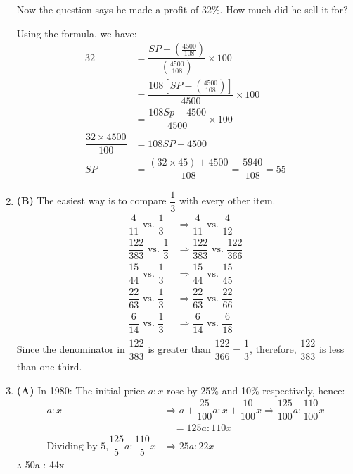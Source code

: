 \begin{multicols}{2}
\begin{enumerate}[label={\arabic*.}]
    Now the question says he made a profit of 32\%. How much did he sell it for?
    
    Using the formula, we have:
    \begin{align*}
    32 &= \dfrac{SP - \left(\frac{4500}{108}\right)}{\left(\frac{4500}{108}\right)} \times 100 \\
    &= \dfrac{108\left[SP - \left(\frac{4500}{108}\right)\right]}{4500} \times 100 \\
    &= \dfrac{108Sp - 4500}{4500} \times 100 \\
    \dfrac{32 \times 4500}{100} &= 108SP - 4500 \\
    SP &= \dfrac{(32 \times 45) + 4500}{108} = \dfrac{5940}{108} = 55
    \end{align*}
    
    \item \textbf{(B)} The easiest way is to compare \(\dfrac{1}{3}\) with every other item.
    \begin{align*}
    \dfrac{4}{11} \text{ vs. } \dfrac{1}{3} &\Rightarrow \dfrac{4}{11} \text{ vs. } \dfrac{4}{12} \\
    \dfrac{122}{383} \text{ vs. } \dfrac{1}{3} &\Rightarrow \dfrac{122}{383} \text{ vs. } \dfrac{122}{366} \\
    \dfrac{15}{44} \text{ vs. } \dfrac{1}{3} &\Rightarrow \dfrac{15}{44} \text{ vs. } \dfrac{15}{45} \\
    \dfrac{22}{63} \text{ vs. } \dfrac{1}{3} &\Rightarrow \dfrac{22}{63} \text{ vs. } \dfrac{22}{66} \\
    \dfrac{6}{14} \text{ vs. } \dfrac{1}{3} &\Rightarrow \dfrac{6}{14} \text{ vs. } \dfrac{6}{18} \\
    \end{align*}
    Since the denominator in \(\dfrac{122}{383}\) is greater than \(\dfrac{122}{366} = \dfrac{1}{3}\), therefore, \(\dfrac{122}{383}\) is less than one-third.
    
    \item \textbf{(A)} In 1980: The initial price \(a : x\) rose by 25\% and 10\% respectively, hence:
    \begin{align*}
    a:x &\Rightarrow a + \dfrac{25}{100}a : x + \dfrac{10}{100}x \Rightarrow \dfrac{125}{100}a : \dfrac{110}{100}x \\
    &\quad = 125a : 110x \\
    \text{Dividing by 5,} \dfrac{125}{5} a : \dfrac{110}{5} x &\Rightarrow 25a : 22x
    \end{align*}
    \(\therefore\)  \hspace{20px} 50a : 44x
    

\end{enumerate}
\end{multicols}
